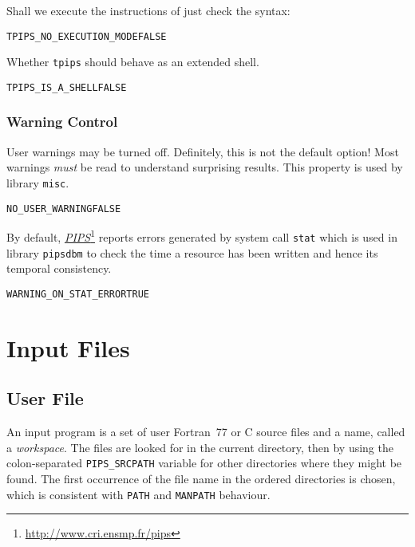 \documentclass[a4paper]{report}
\newenvironment{PipsProp}{\begin{alltt}}{\end{alltt}}
\newcommand{\LINK}[2]{\href{#2}{#1}\footnote{\url{#2}}\xspace}
\newcommand{\PIPS}{\LINK{\emph{PIPS}}{http://www.cri.ensmp.fr/pips}}
\begin{document}
Shall we execute the instructions of just check the syntax:

\begin{PipsProp}
TPIPS_NO_EXECUTION_MODE      FALSE
\end{PipsProp}

Whether \texttt{tpips} should behave as an extended shell.

\begin{PipsProp}
TPIPS_IS_A_SHELL             FALSE
\end{PipsProp}


\subsection{Warning Control}

User warnings may be turned off. Definitely, this is not the default
option! Most warnings {\em must} be read to understand surprising results.
This property is used by library \verb/misc/.

\begin{PipsProp}
NO_USER_WARNING FALSE
\end{PipsProp}

By default, \PIPS{} reports errors generated by system call \verb/stat/
which is used in library \verb/pipsdbm/ to check the time a resource has
been written and hence its temporal consistency.

\begin{PipsProp}
WARNING_ON_STAT_ERROR TRUE
\end{PipsProp}



\chapter{Input Files}
\label{section-input-files}

\section{User File}
\label{subsection-user-file}

An input program is a set of user Fortran~77 or C source files and a name,
called a {\em workspace}. The files are looked for in the current
directory, then by using the colon-separated \verb|PIPS_SRCPATH| variable
for other directories where they might be found. The first occurrence of
the file name in the ordered directories is chosen, which is consistent
with \texttt{PATH} and \texttt{MANPATH} behaviour.
\end{document}
